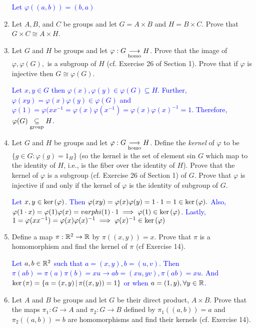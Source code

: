 \documentclass[10pt,a4paper]{report}
\newcommand{\BLUE}[1]{\textcolor{blue}{#1}}
\begin{document}
\begin{enumerate}
	\BLUE{Let $\varphi((a,b)) = (b,a)$}
	
	\item Let $A, B$, and $C$ be groups and let $G=A\times B$ and $H=B\times C$.  Prove that $G\times C \cong A \times H$.
	
	\item Let $G$ and $H$ be groups and let $\varphi: G \underset{\text{homo}}\longrightarrow H$.  Prove that the image of $\varphi, \varphi(G),$ is a subgroup of $H$ (cf. Exercise 26 of Section 1).  Prove that if $\varphi$ is injective then $G \cong \varphi(G)$.
	
	\BLUE{Let $x,y \in G$ then $\varphi(x), \varphi(y) \in \varphi(G)\subseteq H$.  Further, $\varphi(xy)=\varphi(x)\varphi(y) \in \varphi(G)$ and $\varphi(1)=\varphi(xx^{-1} = \varphi(x)\varphi(x^{-1})=\varphi(x)\varphi(x)^{-1} = 1$.  Therefore, $\varphi(G) \underset{\text{group}}\subseteq H$.
	}
	
	\item Let $G$ and $H$ be groups and let $\varphi: G \underset{\text{homo}}\longrightarrow H$. Define the \textit{kernel} of $\varphi$ to be $\{g \in G : \varphi(g)=1_H\}$ (so the kernel is the set of element sin $G$ which map to the identity of $H$, i.e., is the fiber over the identity of $H$).  Prove that the kernel of $\varphi$ is a subgroup (cf. Exercise 26 of Section 1) of $G$.  Prove that $\varphi$ is injective if and only if the kernel of $\varphi$ is the identity of subgroup of $G$.
	
	\BLUE{Let $x,y \in \text{ker}\,(\varphi)$.  Then $\varphi(xy)=\varphi(x)\varphi(y)=1\cdot 1= 1 \in \text{ker}\,(\varphi).$  Also, $\varphi(1\cdot x) = \varphi(1)\varphi(x) = varphi(1)\cdot 1 \implies \varphi(1) \in \text{ker}\,(\varphi)$.  Lastly, $1= \varphi(xx^{-1}) = \varphi(x)\varphi(x)^{-1} \implies \varphi(x)^{-1} \in \text{ker}\,(\varphi)$
	}
	
	\item Define a map $\pi: \mathbb{R}^2 \to \mathbb{R}$ by  $\pi((x,y))=x$.  Prove that $\pi$ is a homomorphism and find the kernel of $\pi$ (cf Exercise 14).
	
	\BLUE{Let $a,b \in \mathbb{R}^2$ such that $a=(x,y), b=(u,v)$.  Then $\pi(ab)=\pi(a)\pi(b)=xu \to ab=(xu, yv), \pi(ab)= xu$.  And $\text{ker}\,(\pi)=\{a=(x,y) \,|\, \pi((x,y))= 1\}$ or when $a=(1,y), \forall y \in \mathbb{R}$.
	}
	
	\item Let $A$ and $B$ be groups and let $G$ be their direct product, $A \times B$. Prove that the maps $\pi_1: G \to A$ and $\pi_2: G \to B$ defined by $\pi_1((a,b))=a$ and $\pi_2((a,b))=b$ are homomorphisms and find their kernels (cf. Exercise 14).
	

\end{enumerate}
\end{document}

